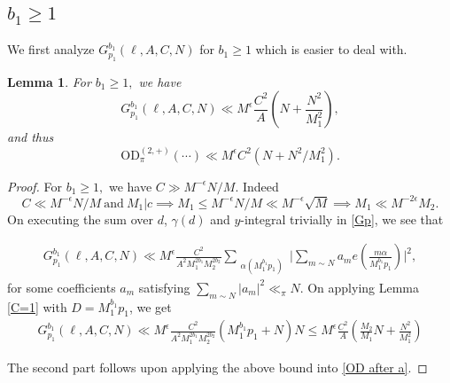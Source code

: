 \documentclass[12pt,a4paper,twoside, reqno]{amsart}
\newcommand{\shortmod}{\ensuremath{\negthickspace \negthickspace \negthickspace \pmod}}
\newcommand{\sumstar}{\sideset{}{^*}\sum}
\newtheorem{lemma}{Lemma}
\begin{document}
\subsection{$b_1 \geq 1$ }
We first analyze $ G_{p_1}^{b_1}(\ell, A,C,N)$ for $b_1 \geq 1$ which is easier to deal with.
\begin{lemma}\label{easy bound}
    For  $b_1 \geq 1,$ we have 
    \[  G_{p_1}^{b_1}(\ell, A,C,N) \ll M^\epsilon \frac{C^2}{A} (N+ \frac{N^2}{M_1^2}),\]
    and thus 
    \[  \mathrm{OD}_{\pi}^{(2, +)}(\cdots)  \ll M^\epsilon  {C^2}{} (N+N^2/M_1^2).   \]
\end{lemma}
\begin{proof}
For $b_1 \geq 1,$ we have  { $C \gg {M^{-\epsilon} N}/{M}$}.  Indeed  
    $$ C \ll {M^{-\epsilon} N}/{M} \ \mathrm{and} \ M_1|c \implies  M_1 \leq M^{-\epsilon}N/M  \ll M^{-\epsilon } \sqrt{M} \implies M_1^{} \ll M^{ -2\epsilon}M_2.$$
On executing the sum over $d$,  $\gamma(d)$ and $y$-integral  trivially in \eqref{Gp}, we see that 
  
 \begin{align}
       G_{p_1}^{b_1}(\ell, A,C,N) \ll  M^\epsilon \frac{C^2  }{A^2 M_1^{2b_1} M_2^{2b_2} }  \mathop{\sum}_{\substack{\alpha (M_1^{b_1}p_1)  }}  \Big| \sum_{m\sim N}  {a_m}  e\left(\frac{    m \alpha}{M_1^{b_1}p_1} \right)     \Big|^2,
\end{align}
for  some  coefficients $a_m$  satisfying $\sum_{m \sim N} |a_m|^2 \ll_\pi N$. On applying  Lemma  \ref{C=1} with $D=M_1^{b_1}p_1$, we get 
\begin{align*}
       G_{p_1}^{b_1}(\ell, A,C,N) \ll  M^\epsilon \frac{C^2}{A^2 M_1^{2b_1} M_2^{2b_2} } ( M_1^{b_1}p_1+N)N \leq M^\epsilon \frac{C^2}{A} ( \frac{M_2}{M_1}N+ \frac{N^2}{M_1^2})
\end{align*}

The second part follows upon applying the above bound into \eqref{OD after a}. 
 \end{proof}
 




\end{document}
